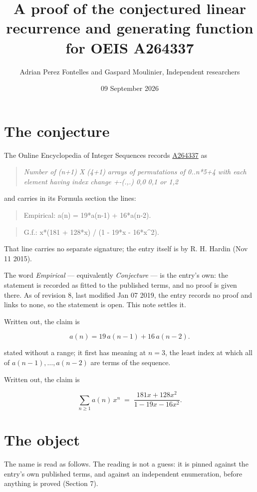 \documentclass[11pt]{article}
\title{A proof of the conjectured linear recurrence and generating function for OEIS A264337}
\author{Adrian Perez Fontelles and Gaspard Moulinier, Independent researchers}
\date{09 September 2026}
\theoremstyle{definition}
\begin{document}
\maketitle
\section{The conjecture}

The Online Encyclopedia of Integer Sequences records \href{https://oeis.org/A264337}{A264337} as

\begin{quote}\itshape Number of (n+1) X (4+1) arrays of permutations of 0..n*5+4 with each element having index change +-(.,.) 0,0 0,1 or 1,2\end{quote}

and carries in its Formula section the lines:

\begin{quote}\ttfamily Empirical: a(n) = 19*a(n-1) + 16*a(n-2).\end{quote}

\begin{quote}\ttfamily G.f.: x*(181 + 128*x) / (1 - 19*x - 16*x\textasciicircum{}2).\end{quote}

That line carries no separate signature; the entry itself is by R. H. Hardin (Nov 11 2015).

The word {\itshape Empirical} --- equivalently {\itshape Conjecture} --- is the entry's own: the statement is recorded as fitted to the published terms, and no proof is given there. As of revision 8, last modified Jan 07 2019, the entry records no proof and links to none, so the statement is open. This note settles it.

Written out, the claim is

\[a(n) = 19\,a(n-1) + 16\,a(n-2).\]

stated without a range; it first has meaning at $n = 3$, the least index at which all of $a(n-1),\dots,a(n-2)$ are terms of the sequence.

Written out, the claim is

\[\sum_{n \ge 1} a(n)\,x^n \;=\; \frac{181x + 128x^{2}}{1 - 19x - 16x^{2}}.\]

\section{The object}

The name is read as follows. The reading is not a guess: it is pinned against the entry's own published terms, and against an independent enumeration, before anything is proved (Section 7).
\end{document}
